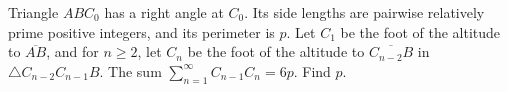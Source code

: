 Triangle $ABC_0$ has a right angle at $C_0$. Its side lengths are pairwise relatively prime positive integers, and its perimeter is $p$. Let $C_1$ be the foot of the altitude to $\overline{AB}$,  and for $n\geq 2$,  let $C_n$ be the foot of the altitude to $\overline{C_{n-2}B}$ in $\triangle C_{n-2}C_{n-1}B$. The sum $\sum\limits_{n=1}^{\infty}C_{n-1}C_n = 6p$. Find $p$.